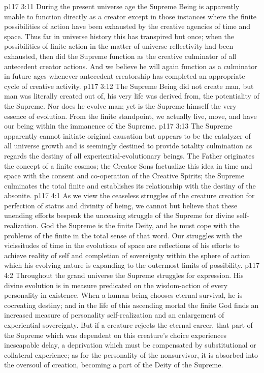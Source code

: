 \pc \vs p117 3:11 During the present universe age the Supreme Being is apparently unable to function directly as a creator except in those instances where the finite possibilities of action have been exhausted by the creative agencies of time and space. Thus far in universe history this has transpired but once; when the possibilities of finite action in the matter of universe reflectivity had been exhausted, then did the Supreme function as the creative culminator of all antecedent creator actions. And we believe he will again function as a culminator in future ages whenever antecedent creatorship has completed an appropriate cycle of creative activity.
\vs p117 3:12 The Supreme Being did not create man, but man was literally created out of, his very life was derived from, the potentiality of the Supreme. Nor does he evolve man; yet is the Supreme himself the very essence of evolution. From the finite standpoint, we actually live, move, and have our being within the immanence of the Supreme.
\vs p117 3:13 The Supreme apparently cannot initiate original causation but appears to be the catalyzer of all universe growth and is seemingly destined to provide totality culmination as regards the destiny of all experiential\hyp{}evolutionary beings. The Father originates the concept of a finite cosmos; the Creator Sons factualize this idea in time and space with the consent and co\hyp{}operation of the Creative Spirits; the Supreme culminates the total finite and establishes its relationship with the destiny of the absonite.
\vs p117 4:1 As we view the ceaseless struggles of the creature creation for perfection of status and divinity of being, we cannot but believe that these unending efforts bespeak the unceasing struggle of the Supreme for divine self\hyp{}realization. God the Supreme is the finite Deity, and he must cope with the problems of the finite in the total sense of that word. Our struggles with the vicissitudes of time in the evolutions of space are reflections of his efforts to achieve reality of self and completion of sovereignty within the sphere of action which his evolving nature is expanding to the outermost limits of possibility.
\vs p117 4:2 Throughout the grand universe the Supreme struggles for expression. His divine evolution is in measure predicated on the wisdom\hyp{}action of every personality in existence. When a human being chooses eternal survival, he is cocreating destiny; and in the life of this ascending mortal the finite God finds an increased measure of personality self\hyp{}realization and an enlargement of experiential sovereignty. But if a creature rejects the eternal career, that part of the Supreme which was dependent on this creature’s choice experiences inescapable delay, a deprivation which must be compensated by substitutional or collateral experience; as for the personality of the nonsurvivor, it is absorbed into the oversoul of creation, becoming a part of the Deity of the Supreme.
